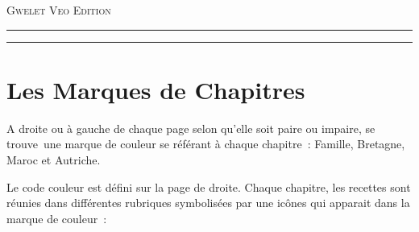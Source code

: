 \documentclass[twoside]{article}
\makeatletter
\newif\if@mainmatter \@mainmattertrue
\newcommand\frontmatter{%
    \cleardoublepage
  \@mainmatterfalse
  \pagenumbering{roman}}
\makeatother
\begin{document}
\begin{titlepage}
	{\large\textsc{Gwelet Veo Edition}} %
	
	\vspace{0.1\textheight} %
	
	\color{black}
	\rule{\textwidth}{0.4pt} %
	
	\vspace{2pt}\vspace{-\baselineskip} %
	
	\rule{\textwidth}{1pt} %
	
\end{titlepage}

\clearpage %
\begingroup
  \pagestyle{empty}
  \null
  \newpage
\endgroup

\frontmatter



\newpage
\fancyhead{} %
\fancyhead[LE]{\bfseries\nouppercase{\leftmark}}      %
\fancyhead[RO]{\bfseries\nouppercase{\leftmark}}      %
\tableofcontents

\newpage
\fancyhead{}
\fancyhead[RO]{\bfseries\nouppercase{\leftmark}}      %

\section*{Les Marques de Chapitres}
A droite ou à gauche de chaque page selon qu’elle soit paire ou impaire, se trouve une marque de couleur se référant 
à chaque chapitre : Famille, Bretagne, Maroc et Autriche.

Le code couleur est défini sur la page de droite.
Chaque chapitre, les recettes sont réunies dans différentes rubriques symbolisées par une icônes qui apparait dans la marque de couleur :
\end{document}
